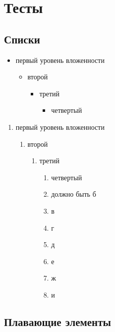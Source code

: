 \documentclass[14pt, a4paper, titlepage]{extarticle}
\begin{document}
\section{Тесты}

\subsection{Списки}
 
\begin{itemize}
    \item первый уровень вложенности
    \begin{itemize}
        \item второй
        \begin{itemize}
            \item третий
            \begin{itemize}
                \item четвертый
            \end{itemize}
        \end{itemize}
    \end{itemize}
\end{itemize}
 
\begin{enumerate}
    \item первый уровень вложенности
    \begin{enumerate}
        \item второй
        \begin{enumerate}
            \item третий
            \begin{enumerate}
                \item четвертый
                \item должно быть б
                \item в
                \item г
                \item д
                \item е
                \item ж
                \item и
            \end{enumerate}
        \end{enumerate}
    \end{enumerate}
\end{enumerate}

\subsection{Плавающие элементы}
 
\end{document}
